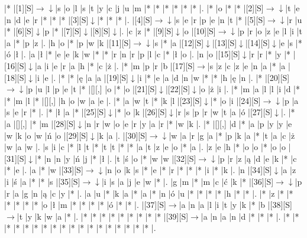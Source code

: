 \documentclass[11pt]{article}
\newcommand\drarr{$\rightarrow \!\!\!\!\! \downarrow$}
\newcommand\rarr{$\rightarrow$}
\newcommand\darr{$\downarrow$}
\begin{document}
\noindent\begin{Puzzle}{17}{26}|*	|[1][S]\drarr	|s	|o	|l	|s	|t	|y	|c	|j	|u	|m	|*	|*	|*	|*	|*	|*	|.
|*	|o	|*	|*	|[2][S]\drarr	|t	|e	|n	|d	|e	|r	|*	|*	|*	|[3][S]\darr	|*	|*	|*	|.
|[4][S]\drarr	|s	|e	|r	|p	|e	|n	|t	|*	|[5][S]\drarr	|r	|u	|*	|[6][S]\darr	|p	|*	|[7][S]\darr	|[8][S]\darr	|.
|c	|z	|*	|[9][S]\darr	|o	|[10][S]\drarr	|p	|r	|o	|z	|e	|l	|i	|t	|a	|*	|p	|z	|.
|h	|o	|*	|p	|w	|k	|[11][S]\drarr	|s	|*	|a	|[12][S]\darr	|[13][S]\darr	|[14][S]\darr	|e	|s	|*	|ó	|ł	|.
|a	|ł	|*	|e	|e	|k	|w	|*	|*	|r	|n	|r	|p	|l	|c	|*	|ł	|o	|.
|n	|o	|[15][S]\darr	|r	|r	|*	|y	|*	|[16][S]\darr	|a	|i	|e	|r	|a	|h	|*	|c	|ż	|.
|*	|m	|p	|r	|b	|[17][S]\rarr	|s	|z	|c	|z	|e	|n	|a	|*	|a	|[18][S]\darr	|i	|e	|.
|*	|*	|ę	|a	|a	|[19][S]\darr	|i	|*	|e	|a	|d	|n	|w	|*	|*	|h	|ę	|n	|.
|*	|[20][S]\drarr	|p	|u	|l	|p	|e	|t	|*	|[][,]{ }	|o	|*	|o	|[21][S]\darr	|[22][S]\darr	|o	|ż	|i	|.
|*	|m	|a	|l	|l	|i	|d	|*	|*	|m	|l	|*	|[][,]{ }	|h	|o	|w	|a	|e	|.
|*	|a	|w	|t	|*	|k	|l	|[23][S]\darr	|*	|o	|i	|[24][S]\drarr	|p	|a	|s	|e	|r	|*	|.
|*	|ł	|a	|*	|[25][S]\darr	|*	|o	|k	|[26][S]\darr	|r	|s	|p	|r	|w	|t	|a	|ó	|[27][S]\darr	|.
|*	|a	|[][,]{ }	|*	|m	|[28][S]\darr	|n	|r	|w	|o	|e	|r	|y	|a	|r	|*	|w	|k	|.
|*	|[][,]{ }	|d	|*	|a	|p	|y	|y	|e	|w	|k	|o	|w	|ń	|o	|[29][S]\darr	|k	|a	|.
|[30][S]\drarr	|w	|a	|r	|g	|a	|*	|p	|k	|a	|*	|t	|a	|c	|ż	|w	|a	|w	|.
|s	|i	|c	|*	|l	|t	|*	|t	|t	|*	|*	|a	|t	|z	|e	|o	|*	|a	|.
|z	|e	|h	|*	|o	|o	|*	|o	|o	|[31][S]\darr	|*	|n	|n	|y	|ń	|j	|*	|ł	|.
|t	|ś	|o	|*	|w	|w	|[32][S]\drarr	|p	|r	|z	|ą	|d	|e	|k	|*	|c	|*	|e	|.
|a	|*	|w	|[33][S]\drarr	|n	|o	|k	|s	|*	|e	|*	|r	|*	|*	|*	|i	|*	|k	|.
|n	|[34][S]\darr	|a	|z	|i	|ś	|a	|*	|*	|s	|[35][S]\drarr	|i	|s	|a	|j	|e	|w	|*	|.
|g	|m	|*	|m	|c	|ć	|k	|*	|[36][S]\drarr	|p	|r	|a	|g	|n	|ą	|c	|y	|*	|.
|a	|u	|*	|k	|a	|*	|a	|*	|n	|ó	|u	|*	|*	|*	|*	|h	|*	|*	|.
|*	|z	|*	|*	|*	|*	|*	|*	|o	|ł	|m	|*	|*	|*	|*	|ó	|*	|*	|.
|[37][S]\rarr	|a	|n	|a	|l	|i	|t	|y	|k	|*	|b	|[38][S]\rarr	|t	|y	|k	|w	|a	|*	|.
|*	|*	|*	|*	|*	|*	|*	|*	|*	|[39][S]\rarr	|a	|n	|a	|n	|d	|*	|*	|*	|.
|*	|*	|*	|*	|*	|*	|*	|*	|*	|*	|*	|*	|*	|*	|*	|*	|*	|*	|.\end{Puzzle}

\newpage
\end{document}
